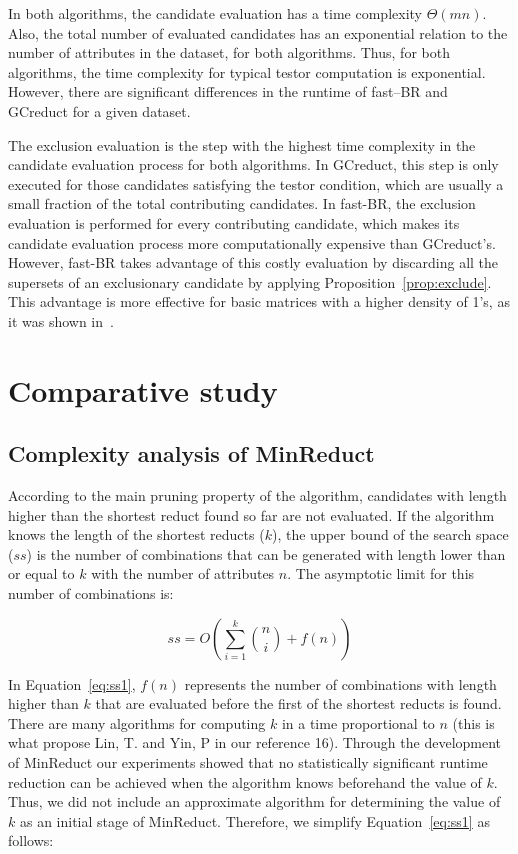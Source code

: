 \documentclass[citenumber]{llncs}
\begin{document}
	
	In both algorithms, the candidate evaluation has a time complexity $\Theta(mn)$. Also, the total number of evaluated candidates has an exponential relation to the number of attributes in the dataset, for both algorithms. Thus, for both algorithms, the time complexity for typical testor computation is exponential. However, there are significant differences in the runtime of fast--BR and GCreduct for a given dataset. 
	
	The exclusion evaluation is the step with the highest time complexity in the candidate evaluation process for both algorithms. In GCreduct, this step is only executed for those candidates satisfying the testor condition, which are usually a small fraction of the total contributing candidates. In fast-BR, the exclusion evaluation is performed for every contributing candidate, which makes its candidate evaluation process more computationally expensive than GCreduct's. However, fast-BR takes advantage of this costly evaluation by discarding all the supersets of an exclusionary candidate by applying Proposition~\ref{prop:exclude}. This advantage is more effective for basic matrices with a higher density of 1's, as it was shown in~\cite{Rodriguez2018}.
%
\section{Comparative study} \label{evaluation}
%
\subsection{Complexity analysis of MinReduct}\label{complexity}
	
	 According to the main pruning property of the algorithm, candidates with length higher than the shortest reduct found so far are not evaluated. If the algorithm knows the length of the shortest reducts ($k$), the upper bound of the search space ($ss$) is the number of combinations that can be generated with length lower than or equal to $k$ with the number of attributes $n$. The asymptotic limit for this number of combinations is: 
	
	\begin{equation}
	ss= O\left( \sum_{i=1}^{k} \binom{n}{i} +f(n)\right)\label{eq:ss1}
	\end{equation}
	
	In Equation~\ref{eq:ss1}, $f(n)$ represents the number of combinations with length higher than $k$ that are evaluated before the first of the shortest reducts is found. There are many algorithms for computing $k$ in a time proportional to $n$ (this is what propose Lin, T. and Yin, P in our reference 16). Through the development of MinReduct our experiments showed that no statistically significant runtime reduction can be achieved when the algorithm knows beforehand the value of $k$. Thus, we did not include an approximate algorithm for determining the value of $k$ as an initial stage of MinReduct. Therefore, we simplify Equation~\ref{eq:ss1} as follows:
	
\end{document}
